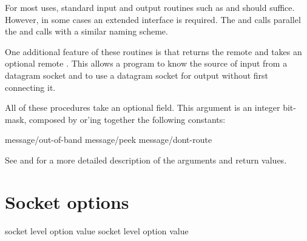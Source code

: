 \begin{desc}
For most uses, standard input and output routines such as
 and  should suffice.  However, in some
cases an extended interface is required. The  and
 calls parallel the  and
 calls with a similar naming scheme.

One additional feature of these routines is that 
returns the remote  and  takes an
optional remote
. This allows a program to know the source of input
from a datagram socket and to use a datagram socket for output without
first connecting it.

All of these procedures take an optional  field. This
argument is an integer bit-mask, composed by or'ing together the
following constants:
\begin{code}\codeallowbreaks
message/out-of-band
message/peek
message/dont-route\end{code}

See  and  for a more detailed
description of the arguments and return values.
\end{desc}

\section{Socket options}

 {socket level option} {value}
 {socket level option value} \undefined

